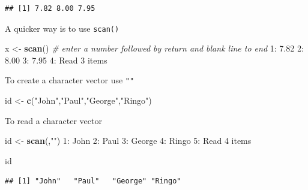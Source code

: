 \documentclass[]{article}
\newenvironment{Shaded}{\begin{snugshade}}{\end{snugshade}}
\newcommand{\KeywordTok}[1]{\textcolor[rgb]{0.13,0.29,0.53}{\textbf{{#1}}}}
\newcommand{\DecValTok}[1]{\textcolor[rgb]{0.00,0.00,0.81}{{#1}}}
\newcommand{\FloatTok}[1]{\textcolor[rgb]{0.00,0.00,0.81}{{#1}}}
\newcommand{\StringTok}[1]{\textcolor[rgb]{0.31,0.60,0.02}{{#1}}}
\newcommand{\CommentTok}[1]{\textcolor[rgb]{0.56,0.35,0.01}{\textit{{#1}}}}
\newcommand{\NormalTok}[1]{{#1}}
\numberwithin{equation}{section}
\begin{document}
\begin{verbatim}
## [1] 7.82 8.00 7.95
\end{verbatim}

A quicker way is to use \texttt{scan()}

\begin{Shaded}
\begin{Highlighting}[]
\NormalTok{x <-}\StringTok{ }\KeywordTok{scan}\NormalTok{()  }\CommentTok{# enter a number followed by return and blank line to end}
\DecValTok{1}\NormalTok{:}\StringTok{ }\FloatTok{7.82}
\DecValTok{2}\NormalTok{:}\StringTok{ }\FloatTok{8.00}
\DecValTok{3}\NormalTok{:}\StringTok{ }\FloatTok{7.95}
\DecValTok{4}\NormalTok{:}\StringTok{ }
\NormalTok{Read }\DecValTok{3} \NormalTok{items}
\end{Highlighting}
\end{Shaded}

To create a character vector use \texttt{""}

\begin{Shaded}
\begin{Highlighting}[]
\NormalTok{id <-}\StringTok{ }\KeywordTok{c}\NormalTok{(}\StringTok{"John"}\NormalTok{,}\StringTok{"Paul"}\NormalTok{,}\StringTok{"George"}\NormalTok{,}\StringTok{"Ringo"}\NormalTok{)}
\end{Highlighting}
\end{Shaded}

To read a character vector

\begin{Shaded}
\begin{Highlighting}[]
\NormalTok{id <-}\StringTok{ }\KeywordTok{scan}\NormalTok{(,}\StringTok{""}\NormalTok{)}
\DecValTok{1}\NormalTok{:}\StringTok{ }\NormalTok{John}
\DecValTok{2}\NormalTok{:}\StringTok{ }\NormalTok{Paul}
\DecValTok{3}\NormalTok{:}\StringTok{ }\NormalTok{George}
\DecValTok{4}\NormalTok{:}\StringTok{ }\NormalTok{Ringo}
\DecValTok{5}\NormalTok{:}\StringTok{ }
\NormalTok{Read }\DecValTok{4} \NormalTok{items  }
\end{Highlighting}
\end{Shaded}

\begin{Shaded}
\begin{Highlighting}[]
\NormalTok{id}
\end{Highlighting}
\end{Shaded}

\begin{verbatim}
## [1] "John"   "Paul"   "George" "Ringo"
\end{verbatim}
\end{document}
